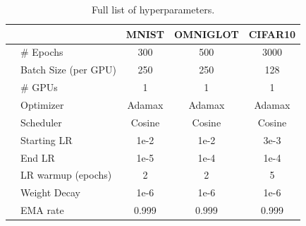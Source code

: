 \begin{table}[h]
\caption{Full list of hyperparameters.}
\label{tab:5_dvp_setup}
\begin{center}
\begin{tabular}{ll||cc|cc|cc}
\toprule
& &  \multicolumn{2}{c|}{MNIST}   & \multicolumn{2}{c|}{OMNIGLOT} 
& \multicolumn{2}{c}{CIFAR10} \\
\midrule
\small{\multirow{11}{*}{\STAB{\rotatebox[origin=c]{90}{Optimization}}}} 
& \# Epochs              & \multicolumn{2}{c|}{300}     
                         & \multicolumn{2}{c|}{500}
                         & \multicolumn{2}{c}{3000}
\\
& Batch Size (per GPU)   & \multicolumn{2}{c|}{250}     & \multicolumn{2}{c|}{250}
                         & \multicolumn{2}{c}{128}
\\
& \# GPUs                & \multicolumn{2}{c|}{1}       & \multicolumn{2}{c|}{1}
                         & \multicolumn{2}{c}{1}
\\
& Optimizer              & \multicolumn{2}{c|}{Adamax}  
                         & \multicolumn{2}{c|}{Adamax}  
                         & \multicolumn{2}{c}{Adamax} 
\\
& Scheduler              &  \multicolumn{2}{c|}{Cosine} 
                         & \multicolumn{2}{c|}{Cosine} 
                         & \multicolumn{2}{c}{Cosine}
\\
& Starting LR            &  \multicolumn{2}{c|}{1e-2}   
                         & \multicolumn{2}{c|}{1e-2} 
                         & \multicolumn{2}{c}{3e-3} 
\\ 
& End LR                 &  \multicolumn{2}{c|}{1e-5}   
                         & \multicolumn{2}{c|}{1e-4} 
                         & \multicolumn{2}{c}{1e-4}
\\ 
& LR warmup (epochs)     &  \multicolumn{2}{c|}{2}   
                         & \multicolumn{2}{c|}{2} 
                         & \multicolumn{2}{c}{5}
\\ 
& Weight Decay           &  \multicolumn{2}{c|}{1e-6}   
                         & \multicolumn{2}{c|}{1e-6} 
                         & \multicolumn{2}{c}{1e-6}
\\
& EMA rate               & \multicolumn{2}{c|}{0.999}       & \multicolumn{2}{c|}{0.999}
                         & \multicolumn{2}{c}{0.999}

\end{tabular}
\end{center}
\end{table}
